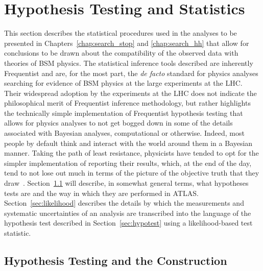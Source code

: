 \section{Hypothesis Testing and Statistics}
\label{sec:stat_hypo}

This section describes the statistical procedures used in the analyses to be
presented in Chapters~\ref{chap:search_stop} and \ref{chap:search_hh} that allow
for conclusions to be drawn about the compatibility of the observed data with theories of
BSM physics.
The statistical inference tools described are inherently Frequentist and
are, for the most part, the \textit{de facto} standard for physics analyses searching for evidence of BSM physics
at the large experiments at the LHC.
Their widespread adoption by the experiments at the LHC does not indicate the
philosophical merit of Frequentist inference methodology, but rather highlights the technically simple implementation
of Frequentist hypothesis testing that allows for physics analyses to not get
bogged down in some of the details associated with Bayesian analyses, computational
or otherwise.
Indeed, most people by default think and interact with the world around them
in a Bayesian manner.
Taking the path of least resistance, physicists have tended to opt for the simpler
implementation of reporting their results, which, at the end of the day,
tend to not lose out much in terms of the picture of the objective truth that they draw~\cite{CousinsBayes}.
Section~\ref{sec:hypo_test} will describe, in somewhat general terms, what
hypotheses tests are and the way in which they are performed in ATLAS.
Section~\ref{sec:likelihood} describes the details by which the measurements and systematic
uncertainties of
an analysis are transcribed into the language of the hypothesis test described
in Section~\ref{sec:hypotest} using a likelihood-based test statistic.


%
%

\subsection{Hypothesis Testing and the \cls Construction}
\label{sec:hypo_test}

